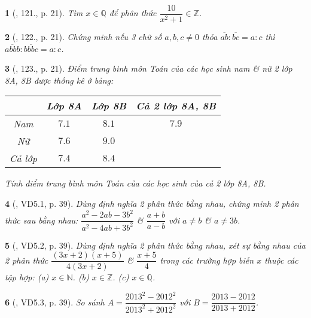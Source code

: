 \documentclass{article}
\newtheorem{baitoan}{}
\begin{document}
\begin{baitoan}[\cite{Binh_Toan_8_tap_1}, 121., p. 21]
	Tìm $x\in\mathbb{Q}$ để phân thức $\dfrac{10}{x^2 + 1}\in\mathbb{Z}$.
\end{baitoan}

\begin{baitoan}[\cite{Binh_Toan_8_tap_1}, 122., p. 21]
	Chứng minh nếu 3 chữ số $a,b,c\ne0$ thỏa $\overline{ab}:\overline{bc} = a:c$ thì $\overline{abbb}:\overline{bbbc} = a:c$.
\end{baitoan}

\begin{baitoan}[\cite{Binh_Toan_8_tap_1}, 123., p. 21]
	Điểm trung bình môn Toán của các học sinh nam \& nữ 2 lớp 8A, 8B được thống kê ở bảng:
	\begin{table}[H]
		\centering
		\begin{tabular}{|c|c|c|c|}
			\hline
			& Lớp 8A & Lớp 8B & Cả 2 lớp 8A, 8B \\
			\hline
			Nam & $7.1$ & $8.1$ & $7.9$ \\
			\hline
			Nữ & $7.6$ & $9.0$ &  \\
			\hline
			Cả lớp & $7.4$ & $8.4$ &  \\
			\hline
		\end{tabular}
	\end{table}
	\noindent Tính điểm trung bình môn Toán của các học sinh của cả 2 lớp 8A, 8B.
\end{baitoan}

\begin{baitoan}[\cite{TLCT_THCS_Toan_8_dai_so}, VD5.1, p. 39]
	Dùng định nghĩa 2 phân thức bằng nhau, chứng minh 2 phân thức sau bằng nhau: $\dfrac{a^2 - 2ab - 3b^2}{a^2 - 4ab + 3b^2}$ \& $\dfrac{a + b}{a - b}$ với $a\ne b$ \& $a\ne 3b$.
\end{baitoan}

\begin{baitoan}[\cite{TLCT_THCS_Toan_8_dai_so}, VD5.2, p. 39]
	Dùng định nghĩa 2 phân thức bằng nhau, xét sự bằng nhau của 2 phân thức $\dfrac{(3x + 2)(x + 5)}{4(3x + 2)}$ \& $\dfrac{x + 5}{4}$ trong các trường hợp biến $x$ thuộc các tập hợp: (a) $x\in\mathbb{N}$. (b) $x\in\mathbb{Z}$. (c) $x\in\mathbb{Q}$.
\end{baitoan}

\begin{baitoan}[\cite{TLCT_THCS_Toan_8_dai_so}, VD5.3, p. 39]
	So sánh $A = \dfrac{2013^2 - 2012^2}{2013^2 + 2012^2}$ với $B = \dfrac{2013 - 2012}{2013 + 2012}$.
\end{baitoan}
\end{document}
